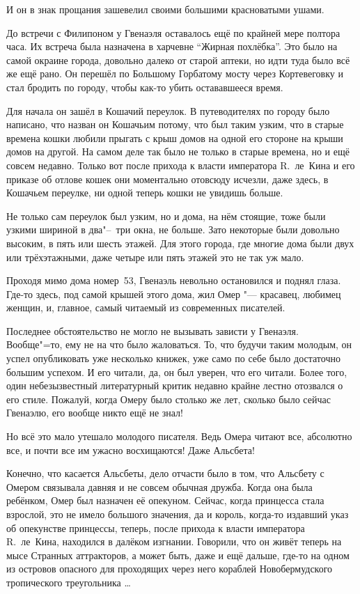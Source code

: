 И он в знак прощания зашевелил своими большими красноватыми ушами.

До встречи с Филипоном у Гвенаэля оставалось ещё по крайней мере полтора часа.
Их встреча была назначена в харчевне \enquote{Жирная похлёбка}.
Это было на самой окраине города, довольно далеко от старой аптеки, но идти туда
было всё же ещё рано.
Он перешёл по Большому Горбатому мосту через Кортевеговку и стал бродить по
городу, чтобы как-то убить остававшееся время.

Для начала он зашёл в Кошачий переулок.
В путеводителях по городу было написано, что назван он Кошачьим потому, что был
таким узким, что в старые времена кошки любили прыгать с крыш домов на одной его
стороне на крыши домов на другой.
На самом деле так было не только в старые времена, но и ещё совсем недавно.
Только вот после прихода к власти императора R.~ле~Кина и его приказе об отлове
кошек они моментально отовсюду исчезли, даже здесь, в Кошачьем переулке, ни
одной теперь кошки не увидишь больше.

Не только сам переулок был узким, но и дома, на нём стоящие, тоже были узкими
шириной в два"--~три окна, не больше.
Зато некоторые были довольно высоким, в пять или шесть этажей.
Для этого города, где многие дома были двух или трёхэтажными, даже четыре или
пять этажей это не так уж мало.

Проходя мимо дома номер~53, Гвенаэль невольно остановился и поднял глаза.
Где-то здесь, под самой крышей этого дома, жил Омер "--- красавец, любимец
женщин, и, главное, самый читаемый из современных писателей.

Последнее обстоятельство не могло не вызывать зависти у Гвенаэля.
Вообще"=то, ему не на что было жаловаться.
То, что будучи таким молодым, он успел опубликовать уже несколько книжек, уже
само по себе было достаточно большим успехом.
И его читали, да, он был уверен, что его читали.
Более того, один небезызвестный литературный критик недавно крайне лестно
отозвался о его стиле.
Пожалуй, когда Омеру было столько же лет, сколько было сейчас Гвенаэлю, его
вообще никто ещё не знал!

Но всё это мало утешало молодого писателя.
Ведь Омера читают все, абсолютно все, и почти все им ужасно восхищаются!
Даже Альсбета!

Конечно, что касается Альсбеты, дело отчасти было в том, что Альсбету с Омером
связывала давняя и не совсем обычная дружба.
Когда она была ребёнком, Омер был назначен её опекуном.
Сейчас, когда принцесса стала взрослой, это не имело большого значения, да и
король, когда-то издавший указ об опекунстве принцессы, теперь, после прихода к
власти императора R.~ле~Кина, находился в далёком изгнании.
Говорили, что он живёт теперь на мысе Странных аттракторов, а может быть, даже и
ещё дальше, где-то на одном из островов опасного для проходящих через него
кораблей Новобермудского тропического треугольника \ldots

